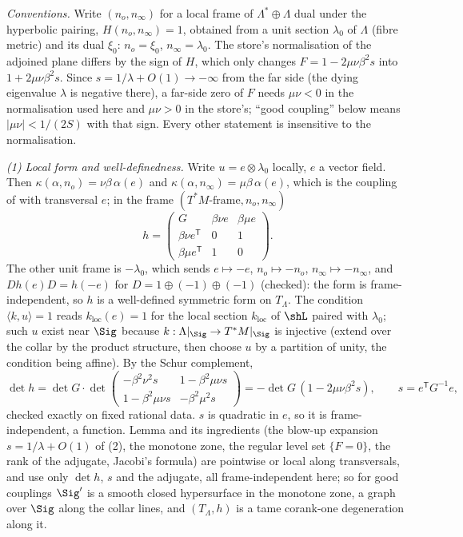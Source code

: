 \emph{Conventions.} Write $(n_o, n_\infty)$ for a local frame of $\Lambda^* \oplus \Lambda$ dual under the hyperbolic pairing, $H(n_o, n_\infty) = 1$, obtained from a unit section $\lambda_0$ of $\Lambda$ (fibre metric) and its dual $\xi_0$: $n_o = \xi_0$, $n_\infty = \lambda_0$. The store's normalisation of the adjoined plane differs by the sign of $H$, which only changes $F = 1 - 2\mu\nu\beta^2 s$ into $1 + 2\mu\nu\beta^2 s$. Since $s = 1/\lambda + O(1) \to -\infty$ from the far side (the dying eigenvalue $\lambda$ is negative there), a far-side zero of $F$ needs $\mu\nu < 0$ in the normalisation used here and $\mu\nu > 0$ in the store's; ``good coupling'' below means $|\mu\nu| < 1/(2S)$ with that sign. Every other statement is insensitive to the normalisation.

\emph{(1) Local form and well-definedness.} Write $u = e \otimes \lambda_0$ locally, $e$ a vector field. Then $\kappa(\alpha, n_o) = \nu\beta\,\alpha(e)$ and $\kappa(\alpha, n_\infty) = \mu\beta\,\alpha(e)$, which is the coupling of  with transversal $e$; in the frame $(T^*M\text{-frame}, n_o, n_\infty)$
\[
h = \begin{pmatrix} G & \beta\nu e & \beta\mu e \\ \beta\nu e^{\mathsf T} & 0 & 1 \\ \beta\mu e^{\mathsf T} & 1 & 0 \end{pmatrix}.
\]
The other unit frame is $-\lambda_0$, which sends $e \mapsto -e$, $n_o \mapsto -n_o$, $n_\infty \mapsto -n_\infty$, and $D h(e) D = h(-e)$ for $D = 1 \oplus (-1) \oplus (-1)$ (checked): the form is frame-independent, so $h$ is a well-defined symmetric form on $T_\Lambda$. The condition $\langle k, u\rangle = 1$ reads $k_{\mathrm{loc}}(e) = 1$ for the local section $k_{\mathrm{loc}}$ of $\shL$ paired with $\lambda_0$; such $u$ exist near $\Sig$ because $k : \Lambda|_\Sig \to T^*M|_\Sig$ is injective (extend over the collar by the product structure, then choose $u$ by a partition of unity, the condition being affine). By the Schur complement,
\[
\det h = \det G \cdot \det\!\begin{pmatrix} -\beta^2\nu^2 s & 1 - \beta^2\mu\nu s \\ 1 - \beta^2\mu\nu s & -\beta^2\mu^2 s\end{pmatrix} = -\det G\,(1 - 2\mu\nu\beta^2 s), \qquad s = e^{\mathsf T}G^{-1}e,
\]
checked exactly on fixed rational data. $s$ is quadratic in $e$, so it is frame-independent, a function. Lemma  and its ingredients (the blow-up expansion $s = 1/\lambda + O(1)$ of (2), the monotone zone, the regular level set $\{F = 0\}$, the rank of the adjugate, Jacobi's formula) are pointwise or local along transversals, and use only $\det h$, $s$ and the adjugate, all frame-independent here; so for good couplings $\Sig'$ is a smooth closed hypersurface in the monotone zone, a graph over $\Sig$ along the collar lines, and $(T_\Lambda, h)$ is a tame corank-one degeneration along it.

